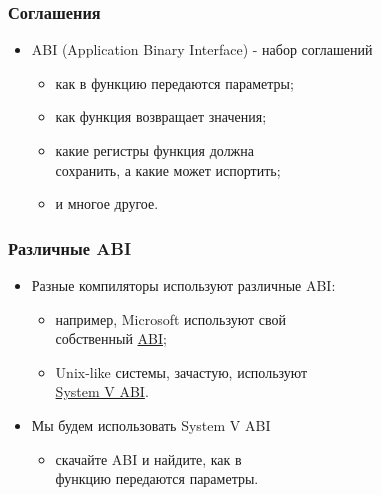 \begin{frame}
\frametitle{Соглашения}
\begin{itemize}
    \item<1->ABI (Application Binary Interface) - набор соглашений
    \begin{itemize}
        \item<2->как в функцию передаются параметры;
        \item<3->как функция возвращает значения;
        \item<4->какие регистры функция должна \\
        сохранить, а какие может испортить;
        \item<4->и многое другое.
    \end{itemize}
\end{itemize}
\end{frame}

\begin{frame}
\frametitle{Различные ABI}
\begin{itemize}
    \item<1-> Разные компиляторы используют различные ABI:
    \begin{itemize}
        \item например, Microsoft используют свой \\
        собственный
        \href{https://msdn.microsoft.com/en-us/library/7kcdt6fy.aspx}{ABI};
        \item Unix-like системы, зачастую, используют \\
        \href{https://software.intel.com/sites/default/files/article/402129/mpx-linux64-abi.pdf}{System V ABI}.
    \end{itemize}
    \item<2-> Мы будем использовать System V ABI
    \begin{itemize}
        \item<3->скачайте ABI и найдите, как в \\
        функцию передаются параметры.
    \end{itemize}
\end{itemize}
\end{frame}
